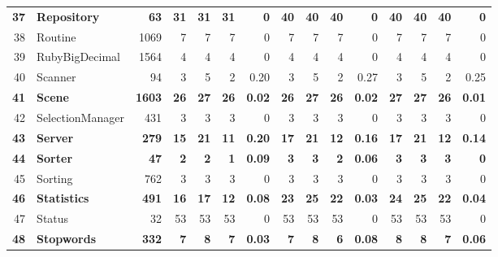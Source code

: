 \documentclass[conference]{IEEEtran}
\begin{document}
\begin{table} [htp!]
{\begin{tabularx}{0.91 \textwidth}{|r|l|r|r|r|r|r|r|r|r|r|r|r|r|r|}
\textbf{37}						& \textbf{Repository}				&\textbf{63}			& \textbf{31}		&	\textbf{31}	&	\textbf{31}	& 	\textbf{0}					& \textbf{40}		&  \textbf{40}		& \textbf{40}		& 		\textbf{0}			& \textbf{40}			& \textbf{40}			& \textbf{40}			&	\textbf{0}	\\         
38						& Routine					&1069		& 7		&	7	&	7	& 	0					& 7		&  7		& 7		& 		0			& 7			& 7			& 7			&	0	\\
39						& RubyBigDecimal			&1564		& 4 		&	4	&	4	& 	0					& 4		& 4 		& 4		& 		0			& 4			& 4			& 4			&	0\\      
40						& Scanner				&94			& 3		&	5	&	2	& 	0.20					& 3		& 5 		& 2		& 		0.27			& 3			& 5			& 2			&	0.25\\      
\textbf{41}						& \textbf{Scene}					&\textbf{1603}		& \textbf{26}		&	\textbf{27}	&	\textbf{26}	& 	\textbf{0.02}					& \textbf{26}		& \textbf{27} 		& \textbf{26}		& 		\textbf{0.02}			& \textbf{27}			& \textbf{27}			& \textbf{26}			&	\textbf{0.01}\\      
42						& SelectionManager			&431		& 3		&	3	&	3	& 	0					& 3		& 3 		& 3		& 		0			& 3			& 3			& 3			&	0\\      
\textbf{43}						& \textbf{Server}					&\textbf{279}		&\textbf{15}		&	\textbf{21}	&	\textbf{11}	& 	\textbf{0.20}					& \textbf{17}		& \textbf{21} 		& \textbf{12}		& 		\textbf{0.16}			& \textbf{17}			& \textbf{21}			& \textbf{12}			&	\textbf{0.14}\\      
\textbf{44}						& \textbf{Sorter}					&\textbf{47}			& \textbf{2}		&	\textbf{2}	&	\textbf{1}	& 	\textbf{0.09}					& \textbf{3}		& \textbf{3} 		& \textbf{2}		& 		\textbf{0.06}			&\textbf{3}			& \textbf{3}			& \textbf{3}			&	\textbf{0}\\      
45						& Sorting					&762		& 3		&	3	&	3	& 	0					& 3		& 3 		& 3		& 		0			& 3			& 3			& 3			&	0\\      
\textbf{46}						& \textbf{Statistics}				&\textbf{491}		& \textbf{16}		&	\textbf{17}	&	\textbf{12}	&	\textbf{0.08}					& \textbf{23}		& \textbf{25} 		& \textbf{22}		& 		\textbf{0.03}			& \textbf{24}			& \textbf{25}			& \textbf{22}			&	\textbf{0.04}\\      
47						& Status					&32			& 53		&	53	&	53	& 	0					& 53		& 53 		& 53		& 		0			& 53			& 53			& 53			&	0\\      
\textbf{48}						& \textbf{Stopwords}				&\textbf{332}		& \textbf{7}		&	\textbf{8}	&	\textbf{7}	& 	\textbf{0.03}					& \textbf{7}		&  \textbf{8}		& \textbf{6}		& 		\textbf{0.08}			& \textbf{8}			& \textbf{8}			& \textbf{7}			&	\textbf{0.06}\\      

\end{tabularx}}
\end{table}
\end{document}
